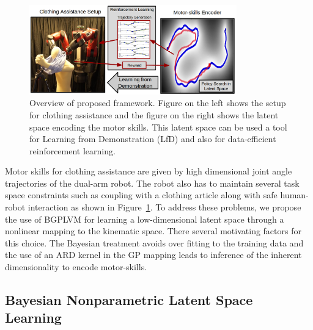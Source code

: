 \documentclass{article}
\begin{document}
\begin{figure}
  \centering
  \includegraphics[width=0.8\textwidth, height=0.2\textheight]{overview.png}
  \caption{Overview of proposed framework. Figure on the left shows the setup for clothing assistance and the figure on the right shows the latent space encoding the motor skills. This latent space can be used a tool for Learning from Demonstration (LfD) and also for data-efficient reinforcement learning.}
  \label{figure:overview}
\end{figure}
Motor skills for clothing assistance are given by high dimensional joint angle trajectories of the dual-arm robot. The robot also has to maintain several task space constraints such as coupling with a clothing article along with safe human-robot interaction as shown in Figure~\ref{figure:overview}. To address these problems, we propose the use of BGPLVM for learning a low-dimensional latent space through a nonlinear mapping to the kinematic space. There several motivating factors for this choice. The Bayesian treatment avoids over fitting to the training data and the use of an ARD kernel in the GP mapping leads to inference of the inherent dimensionality to encode motor-skills.

\subsection{Bayesian Nonparametric Latent Space Learning}
\label{section:bgplvm}
\end{document}
